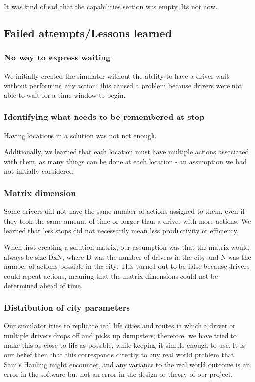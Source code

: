 \documentclass{article}
\begin{document}
It was kind of sad that the capabilities section was empty.
Its not now.


\subsection{Failed attempts/Lessons learned}


\subsubsection{No way to express waiting}

We initially created the simulator without the ability to have a driver wait without performing any action;
this caused a problem because drivers were not able to wait for a time window to begin.  


\subsubsection{Identifying what needs to be remembered at stop}
Having locations in a solution was not not enough.

Additionally, we learned that each location must have multiple actions associated with them, 
as many things can be done at each location - an assumption we had not initially considered.


\subsubsection{Matrix dimension}
Some drivers did not have the same number of actions assigned to them, even if they took the same amount of time or longer than a driver with more actions.
We learned that less stops did not necessarily mean less productivity or efficiency.

When first creating a solution matrix, our assumption was that the matrix would always be size DxN, where D was the number of drivers in the city and N was the number of actions possible in the city. 
This turned out to be false because drivers could repeat actions, meaning that the matrix dimensions could not be determined ahead of time.


\subsubsection{Distribution of city parameters}

Our simulator tries to replicate real life cities and routes in which a driver or multiple drivers drops off and picks up dumpsters;
therefore, we have tried to make this as close to life as possible, while keeping it simple enough to use.
It is our belief then that this corresponds directly to any real world problem that Sam's Hauling might encounter,
and any variance to the real world outcome is an error in the software but not an error in the design or theory of our project.
\end{document}
